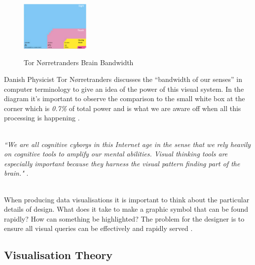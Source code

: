 \documentclass[a4paper,11pt,titlepage]{article}
\begin{document}
		\begin{figure}[H]
    			\centering	
			{{\includegraphics[width=0.3\textwidth]
    				{img/brain_bandwidth.png} 
    			}}%
    			\caption{Tor Nørretranders Brain Bandwidth}%
    		\label{fig:TufteExcellence}
		\end{figure}
		
		\par 
		Danish Physicist Tor Nørretranders discusses the ``bandwidth of our senses” in computer terminology to give an idea of the power of this visual system. In the diagram it's important to observe the comparison to the small white box at the corner which is \textit{0.7\%} of total power and is what we are aware off when all this processing is happening \cite{Tufte2012}.		
		\\\
		\par 
		\textit{``We are all cognitive cyborgs in this Internet age in the sense that we rely heavily on cognitive tools to amplify our mental abilities. Visual thinking tools are especially important because they harness the visual pattern finding part of the brain."} \cite{Ware2010}.
		\\\
		\par 
		When producing data visualisations it is important to think about the particular details of design. What does it take to make a graphic symbol that can be found rapidly? How can something be highlighted? The problem for the designer is to ensure all visual queries can be effectively and rapidly served \cite{Keim2002}. 

	\subsection{Visualisation Theory}
\end{document}
